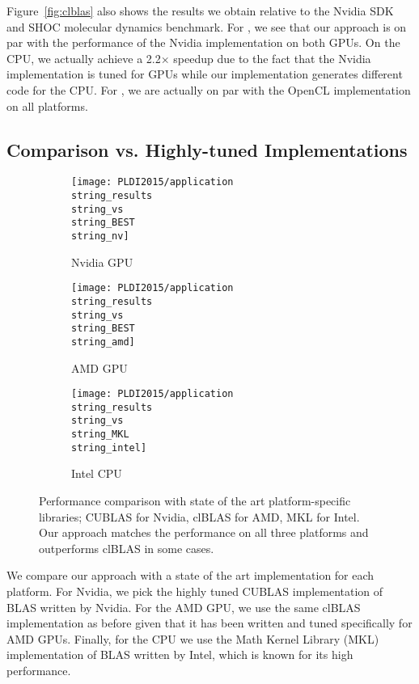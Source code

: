 Figure~\ref{fig:clblas} also shows the results we obtain relative to the Nvidia SDK  and SHOC molecular dynamics  benchmark.
For , we see that our approach is on par with the performance of the Nvidia implementation on both GPUs.
On the CPU, we actually achieve a 2.2$\times$ speedup due to the fact that the Nvidia implementation is tuned for GPUs while our implementation generates different code for the CPU.
For , we are actually on par with the OpenCL implementation on all platforms.

\subsection{Comparison vs. Highly-tuned Implementations}

\begin{figure*}[t]
  \centering
  \begin{subfigure}[b]{0.315\linewidth}
    \texttt{[image: PLDI2015/application\\string\_results\\string\_vs\\string\_BEST\\string\_nv]}
    \caption{Nvidia GPU}
    \label{fig:results-nv}
  \end{subfigure}
  \hspace{0.015\linewidth}
  \begin{subfigure}[b]{0.315\linewidth}
    \texttt{[image: PLDI2015/application\\string\_results\\string\_vs\\string\_BEST\\string\_amd]} 
    \caption{AMD GPU}
    \label{fig:results-amd}
  \end{subfigure}
  \hspace{0.015\linewidth}
  \begin{subfigure}[b]{0.315\linewidth}
    \texttt{[image: PLDI2015/application\\string\_results\\string\_vs\\string\_MKL\\string\_intel]} 
    \caption{Intel CPU}
    \label{fig:results-cpu}
  \end{subfigure}
  \vspace{-1.5em}
  \caption{Performance comparison with state of the art platform-specific libraries; CUBLAS for Nvidia, clBLAS for AMD, MKL for Intel.	  
           Our approach matches the performance on all three platforms and outperforms clBLAS in some cases.
         }
   \label{fig:results}  
\end{figure*}

We compare our approach with a state of the art implementation for each platform.
For Nvidia, we pick the highly tuned CUBLAS implementation of BLAS written by Nvidia.
For the AMD GPU, we use the same clBLAS implementation as before given that it has been written and tuned specifically for AMD GPUs.
Finally, for the CPU we use the Math Kernel Library (MKL) implementation of BLAS written by Intel, which is known for its high performance.


